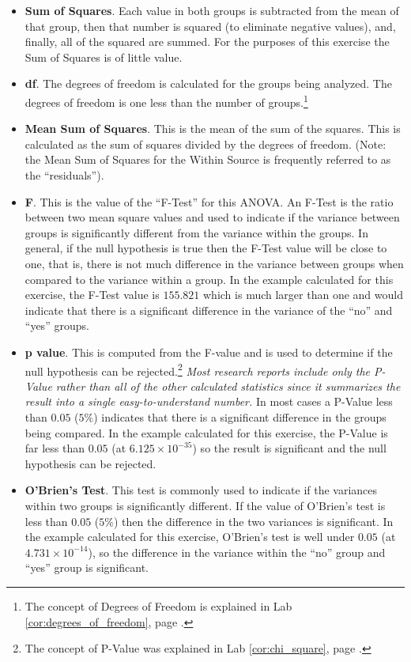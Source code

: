 \begin{enumerate}
\begin{enumerate}
      \begin{itemize}
        \item \textbf{Sum of Squares}. Each value in both groups is subtracted from the mean of that group, then that number is squared (to eliminate negative values), and, finally, all of the squared are summed. For the purposes of this exercise the Sum of Squares is of little value.
        \item \textbf{df}. The degrees of freedom is calculated for the groups being analyzed. The degrees of freedom is one less than the number of groups.\footnote{The concept of Degrees of Freedom is explained in Lab \ref{cor:degrees_of_freedom}, page \pageref{cor:degrees_of_freedom}.}
        \item \textbf{Mean Sum of Squares}. This is the mean of the sum of the squares. This is calculated as the sum of squares divided by the degrees of freedom. (Note: the Mean Sum of Squares for the Within Source is frequently referred to as the ``residuals'').
        \item \textbf{F}. This is the value of the ``F-Test'' for this ANOVA. An F-Test is the ratio between two mean square values and used to indicate if the variance between groups is significantly different from the variance within the groups. In general, if the null hypothesis is true then the F-Test value will be close to one, that is, there is not much difference in the variance between groups when compared to the variance within a group. In the example calculated for this exercise, the F-Test value is $ 155.821 $ which is much larger than one and would indicate that there is a significant difference in the variance of the ``no'' and ``yes'' groups.
        \item \textbf{p value}. This is computed from the F-value and is used to determine if the null hypothesis can be rejected.\footnote{The concept of P-Value was explained in Lab \ref{cor:chi_square}, page \pageref{cor:chi_square}.} \textit{Most research reports include only the P-Value rather than all of the other calculated statistics since it summarizes the result into a single easy-to-understand number.} In most cases a P-Value less than $ 0.05 $ ($ 5\% $) indicates that there is a significant difference in the groups being compared. In the example calculated for this exercise, the P-Value is far less than $ 0.05 $ (at $ 6.125 \times 10^{-35} $) so the result is significant and the null hypothesis can be rejected.
        \item \textbf{O'Brien's Test}. This test is commonly used to indicate if the variances within two groups is significantly different. If the value of O'Brien's test is less than $ 0.05 $ ($ 5\% $) then the difference in the two variances is significant. In the example calculated for this exercise, O'Brien's test is well under $ 0.05 $ (at $ 4.731 \times 10^{-14} $), so the difference in the variance within the ``no'' group and ``yes'' group is significant.
      \end{itemize}
    

\end{enumerate}
\end{enumerate}
